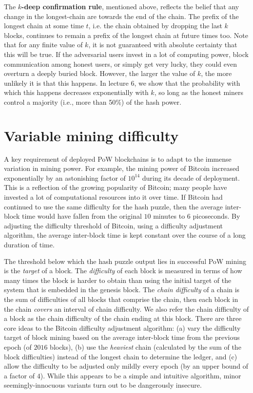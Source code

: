 \documentclass{article}
\begin{document}
The \textbf{$k$-deep confirmation rule}, mentioned above, reflects the belief that any change in the longest-chain are towards the end of the chain. The prefix of the longest chain at some time $t$, i.e. the chain obtained by dropping the last $k$ blocks, continues to remain a prefix of the longest chain at future times too. Note that for any finite value of $k$, it is not guaranteed with absolute certainty that this will be true. If the adversarial users invest in a lot of computing power, block communication among honest users, or simply get very lucky, they could even overturn a deeply buried block. However, the larger the value of $k$, the more unlikely it is that this happens. In lecture 6, we show that the probability with which this happens decreases exponentially with $k$, so long as the honest miners control a majority (i.e., more than 50\%) of the hash power.


\section*{Variable mining difficulty}
A key requirement of deployed PoW blockchains is to adapt to the immense variation in mining power. For example, the mining power of Bitcoin increased exponentially by an astonishing factor of $10^{14}$ during its decade of deployment. This is a reflection of the growing popularity of Bitcoin; many people have invested a lot of computational resources into it over time. If Bitcoin had continued to use the same difficulty for the hash puzzle, then the average inter-block time would have fallen from the original $10$ minutes to $6$ picoseconds. By adjusting the difficulty threshold of Bitcoin, using a difficulty adjustment algorithm, the average inter-block time is kept constant over the course of a long duration of time.

The threshold below which the hash puzzle output lies in successful PoW mining is the {\em target} of a block. The {\em difficulty} of each block is measured in terms of how many times the block is harder to obtain than using the initial target of the system that is embedded in the genesis block. The {\em chain difficulty} of a chain is the sum of difficulties of all blocks that comprise the chain, then each block in the chain {\em covers} an interval of chain difficulty. We also refer the chain difficulty of a block as the chain difficulty of the chain ending at this block. There are three core ideas to the Bitcoin difficulty adjustment algorithm: (a) vary the difficulty target of block mining based on the average inter-block time from the previous epoch (of $2016$ blocks), (b) use the {\em heaviest} chain (calculated by the sum of the block difficulties) instead of the longest chain to determine the ledger, and (c) allow the difficulty to be adjusted only mildly every epoch (by an upper bound of a factor of $4$). While this appears to be a simple and intuitive algorithm, minor seemingly-innocuous variants turn out to be dangerously insecure.
\end{document}
